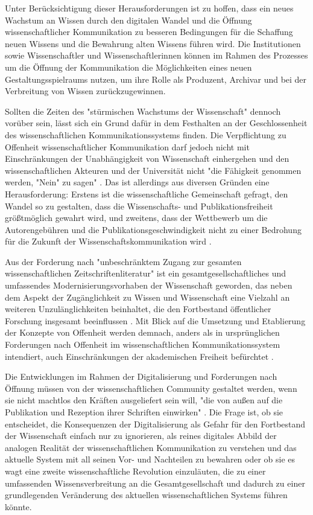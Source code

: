 Unter Berücksichtigung dieser Herausforderungen ist zu hoffen, dass ein neues Wachstum an Wissen durch den digitalen Wandel und die Öffnung wissenschaftlicher Kommunikation zu besseren Bedingungen für die Schaffung neuen Wissens und die Bewahrung alten Wissens führen wird. Die Institutionen sowie Wissenschaftler und Wissenschaftlerinnen können im Rahmen des Prozesses um die Öffnung der Kommunikation die Möglichkeiten eines neuen Gestaltungsspielraums nutzen, um ihre Rolle als Produzent, Archivar und bei der Verbreitung von Wissen zurückzugewinnen.

Sollten die Zeiten des "stürmischen Wachstums der Wissenschaft" \cite{K_lbel_2002} dennoch vorüber sein, lässt sich ein Grund dafür in dem Festhalten an der Geschlossenheit des wissenschaftlichen Kommunikationssystems finden. Die Verpflichtung zu Offenheit wissenschaftlicher Kommunikation darf jedoch nicht mit Einschränkungen der Unabhängigkeit von Wissenschaft einhergehen und den wissenschaftlichen Akteuren und der Universität nicht "die Fähigkeit genommen werden, "Nein" zu sagen" \cite[:12]{Neidhardt_2006}. Das ist allerdings aus diversen Gründen eine Herausforderung: Erstens ist die wissenschaftliche Gemeinschaft gefragt, den Wandel so zu gestalten, dass die Wissenschafts- und Publikationsfreiheit größtmöglich gewahrt wird, und zweitens, dass der Wettbewerb um die Autorengebühren und die Publikationsgeschwindigkeit nicht zu einer Bedrohung für die Zukunft der Wissenschaftskommunikation wird \cite{Beall_2012} \cite{Lossau_2007}.

Aus der Forderung nach "unbeschränktem Zugang zur gesamten wissenschaftlichen Zeitschriftenliteratur" \cite{BOAI_2012} ist ein gesamtgesellschaftliches und umfassendes Modernisierungsvorhaben der Wissenschaft geworden, das neben dem Aspekt der Zugänglichkeit zu Wissen und Wissenschaft eine Vielzahl an weiteren Unzulänglichkeiten beinhaltet, die den Fortbestand öffentlicher Forschung insgesamt beeinflussen \cite{Brembs_2015}. Mit Blick auf die Umsetzung und Etablierung der Konzepte von Offenheit werden demnach, anders als in ursprünglichen Forderungen nach Offenheit im wissenschaftlichen Kommunikationssystem intendiert, auch Einschränkungen der akademischen Freiheit befürchtet \cite{hagner_2015_sache_buches}.

Die Entwicklungen im Rahmen der Digitalisierung und Forderungen nach Öffnung müssen von der wissenschaftlichen Community gestaltet werden, wenn sie nicht machtlos den Kräften ausgeliefert sein will, "die von außen auf die Publikation und Rezeption ihrer Schriften einwirken" \cite{Hirschi_2015}. Die Frage ist, ob sie entscheidet, die Konsequenzen der Digitalisierung als Gefahr für den Fortbestand der Wissenschaft einfach nur zu ignorieren, als reines digitales Abbild der analogen Realität der wissenschaftlichen Kommunikation zu verstehen und das aktuelle System mit all seinen Vor- und Nachteilen zu bewahren oder ob sie es wagt eine zweite wissenschaftliche Revolution einzuläuten, die zu einer umfassenden Wissensverbreitung an die Gesamtgesellschaft und dadurch zu einer grundlegenden Veränderung des aktuellen wissenschaftlichen Systems führen könnte.

